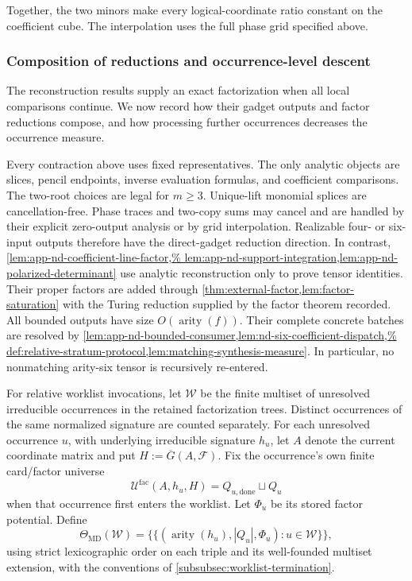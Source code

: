 \documentclass[11pt,letterpaper,onecolumn]{article}
\theoremstyle{plain}
\theoremstyle{definition}
\theoremstyle{remark}
\newcommand{\cF}{\mathcal F}
\newcommand{\arity}{\operatorname{arity}}
\begin{document}
Together, the two minors make every logical-coordinate ratio constant
on the coefficient cube. The interpolation uses the full phase grid
specified above.

\subsubsection{Composition of reductions and occurrence-level descent}
\label{proofsubsec:nd-completion}

The reconstruction results supply an exact factorization when all
local comparisons continue. We now record how their gadget outputs and
factor reductions compose, and how processing further occurrences
decreases the occurrence measure.

Every contraction above uses fixed representatives. The only
analytic objects are slices, pencil endpoints, inverse evaluation formulas,
and coefficient comparisons.  The two-root choices are legal for
\(m\ge3\).  Unique-lift monomial splices are cancellation-free. Phase
traces and two-copy sums may cancel and are handled by their explicit zero-output analysis or by grid interpolation.
Realizable four- or six-input outputs therefore have the direct-gadget reduction direction.  In
contrast, \cref{lem:app-nd-coefficient-line-factor,%
lem:app-nd-support-integration,lem:app-nd-polarized-determinant} use analytic
reconstruction only to prove tensor identities. Their proper factors are
added through \cref{thm:external-factor,lem:factor-saturation} with the Turing reduction supplied by the factor theorem recorded.  All bounded
outputs have size \(O(\arity(f))\).  Their
complete concrete batches are resolved by
\cref{lem:app-nd-bounded-consumer,lem:nd-six-coefficient-dispatch,%
def:relative-stratum-protocol,lem:matching-synthesis-measure}. In particular,
no nonmatching arity-six tensor is recursively re-entered.

For relative worklist invocations, let \(\mathcal W\) be the finite
multiset of unresolved irreducible occurrences in the retained factorization trees. Distinct occurrences of the same normalized signature are counted separately.  For
each unresolved occurrence \(u\), with underlying irreducible
signature \(h_u\), let \(A\) denote the current coordinate matrix and put
\(H:=\overline G(A,\cF)\).  Fix the
occurrence's own finite card/factor universe
\[
 \mathscr U^{\mathrm{fac}}(A,h_u,H)
 =Q_{u,\mathrm{done}}\sqcup Q_u
\]
when that occurrence first enters the worklist.  Let \(\Phi_u\) be its
stored factor potential.  Define
\[
 \Theta_{\mathrm{MD}}(\mathcal W)
 =
 \{\!\{
   (\arity(h_u),|Q_u|,\Phi_u):u\in\mathcal W
 \}\!\},
\]
using strict lexicographic order on each triple and its well-founded multiset
extension, with the conventions of
\cref{subsubsec:worklist-termination}.
\end{document}
